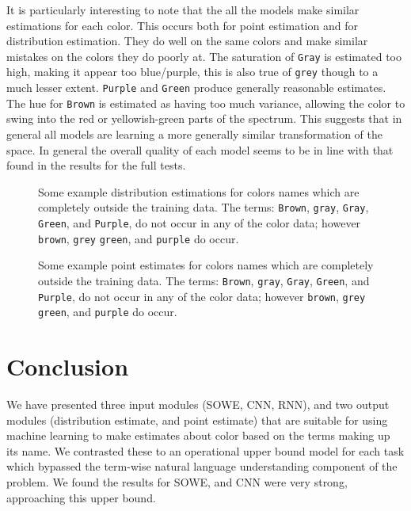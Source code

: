 \documentclass[]{clv3}
\newcommand{\natlang}[1]{\texttt{#1}}
\begin{document}
It is particularly interesting to note that the all the models make similar estimations for each color.
This occurs both for point estimation and for distribution estimation.
They do well on the same colors and make similar mistakes on the colors they do poorly at.
The saturation of \natlang{Gray} is estimated too high, making it appear too blue/purple, this is also true of \natlang{grey} though to a much lesser extent.
\natlang{Purple} and \natlang{Green} produce generally reasonable estimates.
The hue for \natlang{Brown} is estimated as having too much variance, allowing the color to swing into the red or yellowish-green parts of the spectrum.
This suggests that in general all models are learning a more generally similar transformation of the space.
In general the overall quality of each model seems to be in line with that found in the results for the full tests.


\begin{figure}
	\caption{Some example distribution estimations for colors names which are completely outside the training data. The terms: \natlang{Brown}, \natlang{gray}, \natlang{Gray}, \natlang{Green}, and \natlang{Purple}, do not occur in any of the color data; however \natlang{brown}, \natlang{grey} \natlang{green}, and \natlang{purple} do occur.} \label{fig:oovdist}
\end{figure}

\begin{figure}
	\caption{Some example point estimates for colors names which are completely outside the training data. The terms: \natlang{Brown}, \natlang{gray}, \natlang{Gray}, \natlang{Green}, and \natlang{Purple}, do not occur in any of the color data; however \natlang{brown}, \natlang{grey} \natlang{green}, and \natlang{purple} do occur.} \label{fig:oovpoint}
\end{figure}



\section{Conclusion}
We have presented three input modules (SOWE, CNN, RNN),
and two output modules (distribution estimate, and point estimate)
that are suitable for using machine learning to make estimates about color based on the terms making up its name.
We contrasted these to an operational upper bound model for each task which bypassed the term-wise natural language understanding component of the problem.
We found the results for SOWE, and CNN were very strong, approaching this upper bound.
\end{document}
